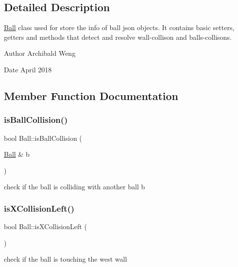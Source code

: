 \subsection{Detailed Description}
\mbox{\hyperlink{class_ball}{Ball}} class used for store the info of ball json objects. It contains basic setters, getters and methods that detect and resolve wall-\/collison and balls-\/collisons. 

\begin{DoxyAuthor}{Author}
Archibald Weng 
\end{DoxyAuthor}
\begin{DoxyDate}{Date}
April 2018 
\end{DoxyDate}


\subsection{Member Function Documentation}
\mbox{\label{class_ball_a34427cdba5ef3f0b6a7bd710234272c6}} 
\subsubsection{\texorpdfstring{is\+Ball\+Collision()}{isBallCollision()}}
{\footnotesize\ttfamily bool Ball\+::is\+Ball\+Collision (\begin{DoxyParamCaption}\item[{\mbox{\hyperlink{class_ball}{Ball}} \&}]{b }\end{DoxyParamCaption})}

check if the ball is colliding with another ball b \mbox{\label{class_ball_ac78e9493b3dd882154f449fbf9d46673}} 
\subsubsection{\texorpdfstring{is\+X\+Collision\+Left()}{isXCollisionLeft()}}
{\footnotesize\ttfamily bool Ball\+::is\+X\+Collision\+Left (\begin{DoxyParamCaption}{ }\end{DoxyParamCaption})}

check if the ball is touching the west wall \mbox{\label{class_ball_a7ea99601caa442c45b150723fa9d5dfb}} 
